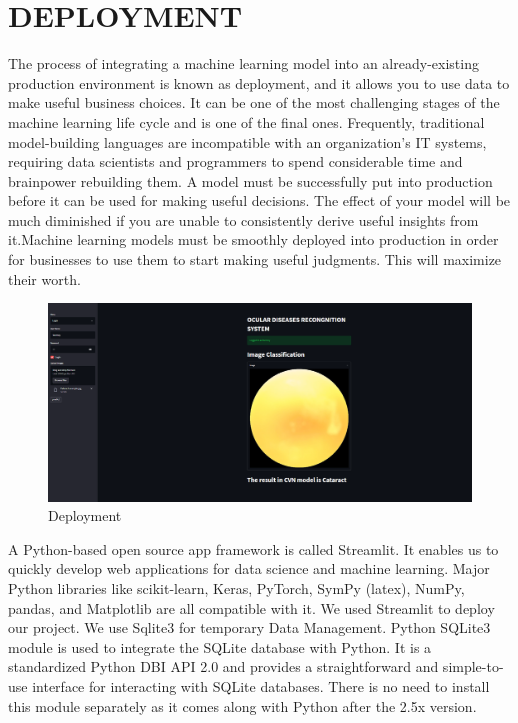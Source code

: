 \chapter{DEPLOYMENT}
The process of integrating a machine learning model into an already-existing production environment is known as deployment, and it allows you to use data to make useful business choices. It can be one of the most challenging stages of the machine learning life cycle and is one of the final ones. Frequently, traditional model-building languages are incompatible with an organization's IT systems, requiring data scientists and programmers to spend considerable time and brainpower rebuilding them. A model must be successfully put into production before it can be used for making useful decisions. The effect of your model will be much diminished if you are unable to consistently derive useful insights from it.Machine learning models must be smoothly deployed into production in order for businesses to use them to start making useful judgments. This will maximize their worth.\\ 

\begin{figure}[H]
    \centering
    \includegraphics[scale=0.4]{70_Deployment/Deploy.png}
    \caption{Deployment}
    \label{deploy}
\end{figure}

A Python-based open source app framework is called Streamlit. It enables us to quickly develop web applications for data science and machine learning. Major Python libraries like scikit-learn, Keras, PyTorch, SymPy (latex), NumPy, pandas, and Matplotlib are all compatible with it. We used Streamlit to deploy our project.
We use Sqlite3 for temporary Data Management. Python SQLite3 module is used to integrate the SQLite database with Python. It is a standardized Python DBI API 2.0 and provides a straightforward and simple-to-use interface for interacting with SQLite databases. There is no need to install this module separately as it comes along with Python after the 2.5x version.
